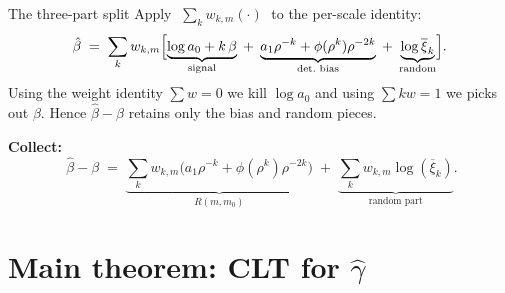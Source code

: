 \documentclass[10pt, aspectratio=169, xcolor={table}]{beamer}
\newcommand{\TODO}[1]{{\color{red}\textbf{[TODO]} #1}}
\renewcommand{\TODO}[1]{}
\begin{document}
\begin{frame}{The three-part split}
  Apply $\;\sum_k w_{k,m}(\cdot)\;$ to the per-scale identity:
  \[
    \hat\beta \;=\; \sum_k w_{k,m}\Bigl[
        \underbrace{\log a_0 + k\,\beta}_{\text{signal}}
        \;+\; \underbrace{a_1\rho^{-k} + \phi(\rho^k)\rho^{-2k}}_{\text{det.\ bias}}
        \;+\; \underbrace{\log\overline{\xi}_k}_{\text{random}}
      \Bigr].
  \]
  Using the weight identity $\sum w = 0$ we kill $\log a_0$ and using $\sum k w = 1$ we
  picks out $\beta$. Hence $\hat\beta - \beta$ retains only the bias
  and random pieces.


  \vspace{0.3em}
  \textbf{Collect:}
  \[
    \boxed{\;
      \hat\beta - \beta
        \;=\;
        \underbrace{\sum_k w_{k,m}\bigl(a_1\rho^{-k} + \phi(\rho^k)\rho^{-2k}\bigr)}_{\displaystyle R(m,m_0)}
        \;+\;
        \underbrace{\sum_k w_{k,m} \log(\overline{\xi}_k)}_{\text{random part}}.
        }
  \]

  \TODO{The whole Section 5 proof is one sentence: control $R$, $S$, $Q$
        separately. $R$ is deterministic --- killed by $m_0$.
        $S$ goes through Lindeberg--Feller (a CLT). $Q$ vanishes
        faster than the CLT rate on $\mathcal G_k$; the bad event
        $\mathcal G_k^c$ is handled by Chebyshev + Cauchy--Schwarz.}
\end{frame}

\section{Main theorem: CLT for $\hat\gamma$}
\end{document}
